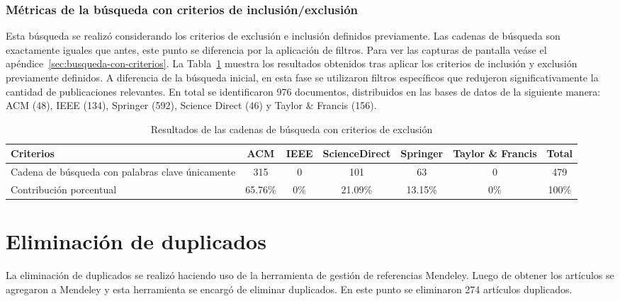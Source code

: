 \subsubsection{Métricas de la búsqueda con criterios de inclusión/exclusión}\label{subsec:resumenBusquedaCriterios}
\noindent
Esta búsqueda se realizó considerando los criterios de exclusión e inclusión definidos previamente. Las cadenas de búsqueda son exactamente iguales que antes, este punto se diferencia por la aplicación de filtros. Para ver las capturas de pantalla veáse el apéndice~\ref{sec:busqueda-con-criterios}.
La Tabla~\ref{table:bases-con-exclusion} muestra los resultados obtenidos tras aplicar los criterios de inclusión y exclusión previamente definidos. A diferencia de la búsqueda inicial, en esta fase se utilizaron filtros específicos que redujeron significativamente la cantidad de publicaciones relevantes. En total se identificaron 976 documentos, distribuidos en las bases de datos de la siguiente manera: ACM (48), IEEE (134), Springer (592), Science Direct (46) y Taylor \& Francis (156).

\begin{table}[H]
	\centering
	\caption{Resultados de las cadenas de búsqueda con criterios de exclusión}
	\label{table:bases-con-exclusion}
	\begin{tabular}{|p{4.5cm}|c|c|c|c|c|c|}
		\hline
		\textbf{Criterios}                               & \textbf{ACM} & \textbf{IEEE} & \textbf{ScienceDirect} & \textbf{Springer} & \textbf{Taylor \& Francis} & \textbf{Total} \\
		\hline
		Cadena de búsqueda con palabras clave únicamente & 315          & 0             & 101                    & 63                & 0                          & 479            \\
		\hline
		Contribución porcentual                          & 65.76\%      & 0\%           & 21.09\%                & 13.15\%           & 0\%                        & 100\%          \\
		\hline
	\end{tabular}
\end{table}








\section{Eliminación de duplicados}\label{sec:eliminacionDuplicados}
\noindent
La eliminación de duplicados se realizó haciendo uso de la herramienta de gestión de referencias Mendeley. Luego de obtener los artículos se agregaron a Mendeley y esta herramienta se encargó de eliminar duplicados. En este punto se eliminaron 274 artículos duplicados.

